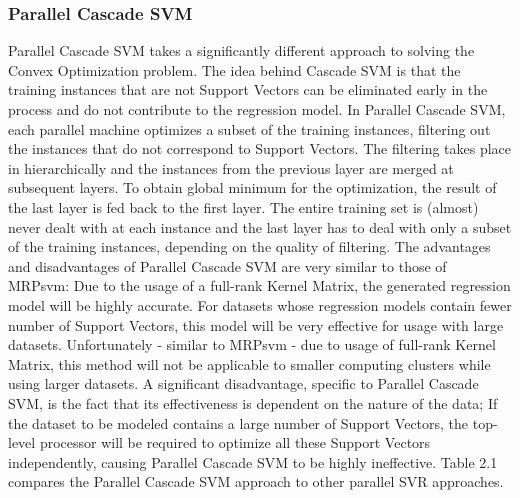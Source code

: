 \documentclass[12pt]{article}
\begin{document}
\subsubsection{Parallel Cascade SVM}
Parallel Cascade SVM takes a significantly different approach to solving the Convex Optimization problem. The idea behind Cascade SVM is that the training instances that are not Support Vectors can be eliminated early in the process and do not contribute to the regression model. In Parallel Cascade SVM, each parallel machine optimizes a subset of the training instances, filtering out the instances that do not correspond to Support Vectors. The filtering takes place in hierarchically and the instances from the previous layer are merged at subsequent layers. To obtain global minimum for the optimization, the result of the last layer is fed back to the first layer. The entire training set is (almost) never dealt with at each instance and the last layer has to deal with only a subset of the training instances, depending on the quality of filtering.
\newline\newline
The advantages and disadvantages of Parallel Cascade SVM are very similar to those of MRPsvm: Due to the usage of a full-rank Kernel Matrix, the generated regression model will be highly accurate. For datasets whose regression models contain fewer number of Support Vectors, this model will be very effective for usage with large datasets.\newline
Unfortunately - similar to MRPsvm - due to usage of full-rank Kernel Matrix, this method will not be applicable to smaller computing clusters while using larger datasets. A significant disadvantage, specific to Parallel Cascade SVM, is the fact that its effectiveness is dependent on the nature of the data; If the dataset to be modeled contains a large number of Support Vectors, the top-level processor will be required to optimize all these Support Vectors independently, causing Parallel Cascade SVM to be highly ineffective.
\newline\newline
Table 2.1 compares the Parallel Cascade SVM approach to other parallel SVR approaches.
\end{document}
